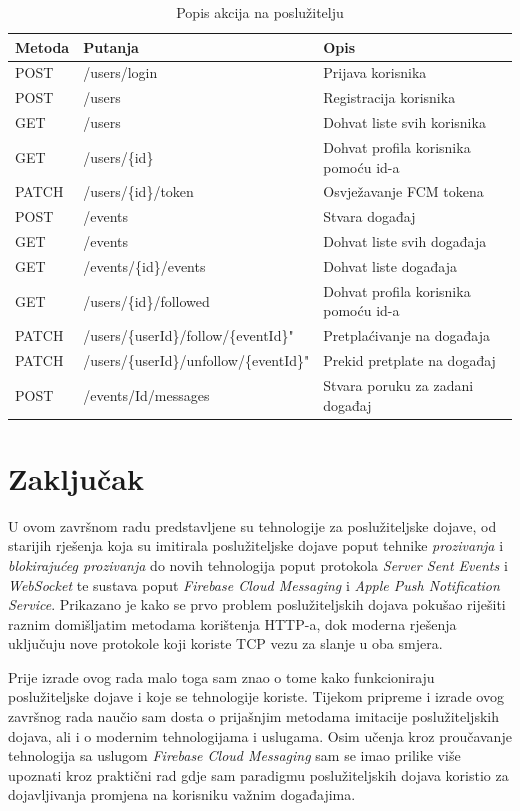 \documentclass[times, utf8, zavrsni]{fer}
\begin{document}
{\begin{table}[htb]
\caption{Popis akcija na poslužitelju}
\label{tbl:endpoints}
\centering
\begin{tabular}{lll} \hline
Metoda & Putanja & Opis\\ \hline
POST & /users/login & Prijava korisnika\\
POST & /users & Registracija korisnika\\
GET & /users & Dohvat liste svih korisnika\\
GET & /users/\{id\} & Dohvat profila korisnika pomoću id-a\\
PATCH & /users/\{id\}/token & Osvježavanje FCM tokena\\
POST & /events & Stvara događaj\\
GET & /events & Dohvat liste svih događaja\\
GET & /events/\{id\}/events & Dohvat liste događaja\\
GET & /users/\{id\}/followed & Dohvat profila korisnika pomoću id-a\\
PATCH & /users/\{userId\}/follow/\{eventId\}" & Pretplaćivanje na događaja\\
PATCH & /users/\{userId\}/unfollow/\{eventId\}" & Prekid pretplate na događaj\\
POST & /events/{Id}/messages & Stvara poruku za zadani događaj\\ \hline
\end{tabular}
\end{table}

\chapter{Zaključak}

U ovom završnom radu predstavljene su tehnologije za poslužiteljske dojave, od starijih rješenja koja su imitirala poslužiteljske dojave poput tehnike {\em prozivanja} i {\em blokirajućeg prozivanja} do novih tehnologija poput protokola {\em Server Sent Events} i {\em WebSocket} te sustava poput {\em Firebase Cloud Messaging} i {\em Apple Push Notification Service}. Prikazano je kako se prvo problem poslužiteljskih dojava pokušao riješiti raznim domišljatim metodama korištenja HTTP-a, dok moderna rješenja uključuju nove protokole koji koriste TCP vezu za slanje u oba smjera.

Prije izrade ovog rada malo toga sam znao o tome kako funkcioniraju poslužiteljske dojave i koje se tehnologije koriste. Tijekom pripreme i izrade ovog završnog rada naučio sam dosta o prijašnjim metodama imitacije poslužiteljskih dojava, ali i o modernim tehnologijama i uslugama. Osim učenja kroz proučavanje tehnologija sa uslugom {\em Firebase Cloud Messaging} sam se imao prilike više upoznati kroz praktični rad gdje sam paradigmu poslužiteljskih dojava koristio za dojavljivanja promjena na korisniku važnim događajima.

}
\end{document}

